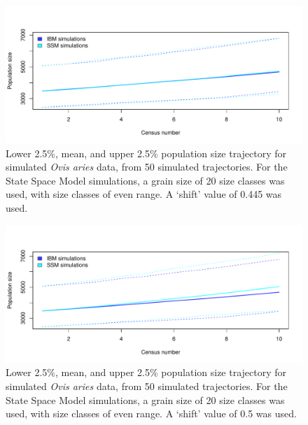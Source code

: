\documentclass[a4paper,12pt]{article}
\begin{document}
\begin{figure}[H]
\centering
\includegraphics[scale=0.75]{shiftCorrect.pdf}
\caption{\label{correctShift}Lower 2.5\%, mean, and upper 2.5\% population size trajectory for simulated \textit{Ovis aries} data, from 50 simulated trajectories. For the State Space Model simulations, a grain size of 20 size classes was used, with size classes of even range. A `shift' value of 0.445 was used.}
\end{figure}

\begin{figure}[H]
\centering
\includegraphics[scale=0.75]{shiftIncorrect.pdf}
\caption{\label{incorrectShift}Lower 2.5\%, mean, and upper 2.5\% population size trajectory for simulated \textit{Ovis aries} data, from 50 simulated trajectories. For the State Space Model simulations, a grain size of 20 size classes was used, with size classes of even range. A `shift' value of 0.5 was used.}
\end{figure}
\end{document}
